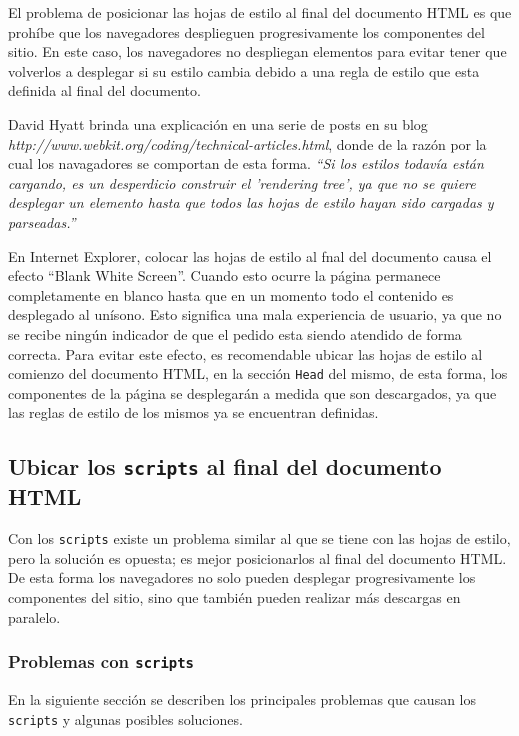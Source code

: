 \documentclass[a4paper,12pt]{report}
\begin{document}
El problema de posicionar las hojas de estilo al final del documento HTML es que prohíbe que los navegadores desplieguen progresivamente los componentes del sitio.
En este caso, los navegadores no despliegan elementos para evitar tener que volverlos a desplegar si su estilo cambia debido a una regla de estilo que esta definida al final del documento.

David Hyatt brinda una explicación en una serie de posts en su blog \emph{http://www.webkit.org/coding/technical-articles.html}, donde de la razón por la cual los navagadores se comportan de esta forma.
\emph{``Si los estilos todavía están cargando, es un desperdicio construir el 'rendering tree', ya que no se quiere desplegar un elemento
hasta que todos las hojas de estilo hayan sido cargadas y parseadas.''}

En Internet Explorer, colocar las hojas de estilo al fnal del documento causa el efecto ``Blank White Screen''. Cuando esto ocurre la página permanece completamente
en blanco hasta que en un momento todo el contenido es desplegado al unísono. Esto significa una mala experiencia de usuario, ya que no se recibe ningún
indicador de que el pedido esta siendo atendido de forma correcta.
Para evitar este efecto, es recomendable ubicar las hojas de estilo al comienzo del documento HTML, en la sección \texttt{Head} del mismo, de esta forma, los componentes
de la página se desplegarán a medida que son descargados, ya que las reglas de estilo de los mismos ya se encuentran definidas.

\subsection{Ubicar los \texttt{scripts} al final del documento HTML}

Con los \texttt{scripts} existe un problema similar al que se tiene con las hojas de estilo, pero la solución es opuesta; es mejor posicionarlos al final del documento HTML. 
De esta forma los navegadores no solo pueden desplegar progresivamente los componentes del sitio,
sino que también pueden realizar más descargas en paralelo.

\subsubsection{Problemas con \texttt{scripts}}

En la siguiente sección se describen los principales problemas que causan los \texttt{scripts} y algunas posibles soluciones.
\end{document}
